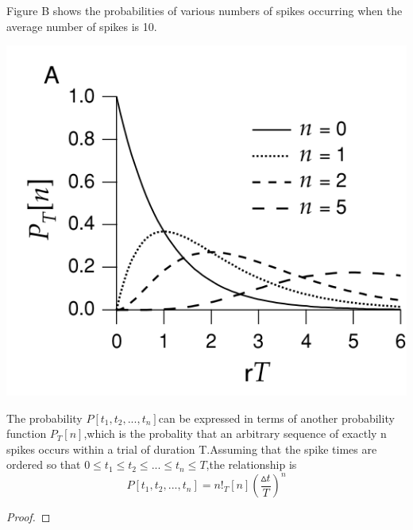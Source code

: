\begin{exm}
    Figure B shows the probabilities of various numbers of spikes occurring when the average number of spikes is 10.
\end{exm}    
\begin{center}
    \label{Figure 1.11 (A)}    
    \includegraphics[scale = 0.15]{png/Figure1-4-1-A.png}\\
\end{center}



\begin{thm}
    The probability $P[t_1,t_2,...,t_n]$can be expressed in terms of another probability function $P_T[n]$,which is the probality that an arbitrary sequence of exactly n spikes occurs within a trial of duration T.Assuming that the spike times are ordered so that $0\leq t_1\leq t_2\leq ...\leq t_n\leq T$,the relationship is 
    \begin{equation}
        P[t_1,t_2,...,t_n]=n!{_T[n](\frac{\vartriangle t}{T})^n}
    \end{equation}
    \begin{proof}
    \end{proof}
\end{thm}


